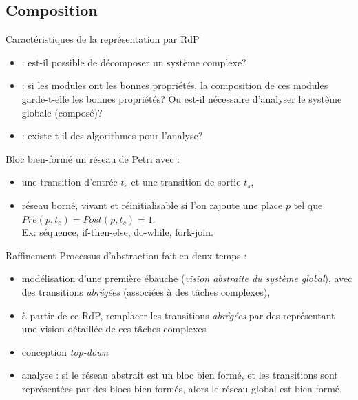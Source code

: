 \documentclass[compress]{beamer}
\begin{document}
\subsection{Composition}
\begin{frame}{Caractéristiques de la représentation par RdP}
\begin{itemize}
\item {} : est-il possible de décomposer un système complexe?
\item {} : si les modules ont les bonnes propriétés, la composition de ces modules garde-t-elle les bonnes propriétés? Ou est-il nécessaire d'analyser le système globale (composé)?
\item {} : existe-t-il des algorithmes pour l'analyse?
\end{itemize}
\begin{block}{Bloc bien-formé}
	un réseau de Petri avec :
	\begin{itemize}
	\item une transition d'entrée $t_e$ et une transition de sortie $t_s$,
	\item réseau borné, vivant et réinitialisable si l'on rajoute une place $p$ tel que $Pre(p,t_e)=Post(p,t_s)=1$. \\
	Ex: séquence, if-then-else, do-while, fork-join.
	\end{itemize}
\end{block}
\end{frame}

\begin{frame}{Raffinement}
Processus d'abstraction fait en deux temps :
\begin{itemize}
\item modélisation d'une  première ébauche ({\it vision abstraite du système global}), avec des transitions {\it abrégées} (associées à des tâches complexes),
\item à partir de ce RdP, remplacer les transitions {\it abrégées} par des  représentant une vision détaillée de ces tâches complexes
\item conception {\it top-down}
\item analyse : si le réseau abstrait est un bloc bien formé, et les transitions sont représentées par des blocs bien formés, alors le réseau global est bien formé.
\end{itemize} 
\end{frame}
\end{document}
